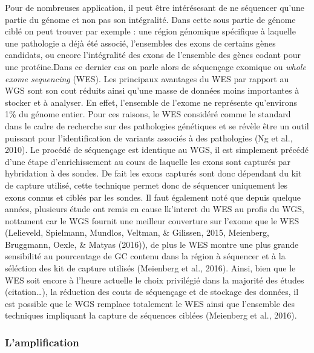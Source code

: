 \documentclass[12pt,twoside]{reedthesis}
\theoremstyle{definition}
\theoremstyle{definition}
\theoremstyle{remark}
\begin{document}
  Pour de nombreuses application, il peut être intérésesant de ne
  séquencer qu'une partie du génome et non pas son intégralité. Dans cette
  sous partie de génome ciblé on peut trouver par exemple : une région
  génomique spécifique à laquelle une pathologie a déjà été associé,
  l'ensembles des exons de certains gènes candidats, ou encore
  l'intégralité des exons de l'ensemble des gènes codant pour une
  protéine.Dans ce dernier cas on parle alors de séquençage exomique ou
  \emph{whole exome sequencing} (WES). Les principaux avantages du WES par
  rapport au WGS sont son cout réduits ainsi qu'une masse de données moins
  importantes à stocker et à analyser. En effet, l'ensemble de l'exome ne
  représente qu'environs 1\% du génome entier. Pour ces raisons, le WES
  considéré comme le standard dans le cadre de recherche sur des
  pathologies génétiques et se révèle être un outil puissant pour
  l'identification de variants associés à des pathologies (Ng et al.,
  2010). Le procédé de séquençage est identique au WGS, il est simplement
  précédé d'une étape d'enrichissement au cours de laquelle les exons sont
  capturés par hybridation à des sondes. De fait les exons capturés sont
  donc dépendant du kit de capture utilisé, cette technique permet donc de
  séquencer uniquement les exons connus et ciblés par les sondes. Il faut
  également noté que depuis quelque années, plusieurs étude ont remis en
  cause lk'interet du WES au profis du WGS, nottament car le WGS fournit
  une meilleur couverture sur l'exome que le WES (Lelieveld, Spielmann,
  Mundlos, Veltman, \& Gilissen, 2015, Meienberg, Bruggmann, Oexle, \&
  Matyas (2016)), de plus le WES montre une plus grande sensibilité au
  pourcentage de GC contenu dans la région à séquencer et à la séléction
  des kit de capture utilisés (Meienberg et al., 2016). Ainsi, bien que le
  WES soit encore à l'heure actuelle le choix privilégié dans la majorité
  des études (citation\ldots{}), la réduction des couts de séquençage et
  de stockage des données, il est possible que le WGS remplace totalement
  le WES ainsi que l'ensemble des techniques impliquant la capture de
  séquences ciblées (Meienberg et al., 2016).
  
  \subsubsection{L'amplification}\label{lamplification}
  
\end{document}
